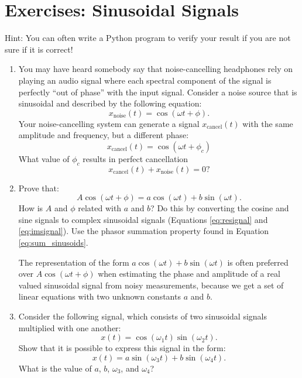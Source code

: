 \newpage
\section{Exercises: Sinusoidal Signals}

Hint: You can often write a Python program to verify your result if you are not sure if it is correct!

\begin{enumerate}

\item You may have heard somebody say that noise-cancelling headphones
  rely on playing an audio signal where each spectral component of the
  signal is perfectly ``out of phase'' with the input signal. Consider
  a noise source that is sinusoidal and described by the following
  equation:
\begin{equation}
x_{\mathrm{noise}}(t) = \cos(\omega t + \phi).
\end{equation}
Your noise-cancelling system can generate a signal
$x_{\mathrm{cancel}}(t)$ with the same amplitude and frequency, but a different phase:
\begin{equation}
x_{\mathrm{cancel}}(t) = \cos(\omega t + \phi_c)
\end{equation}
What value of $\phi_c$ results in perfect cancellation
\begin{equation}
  x_{\mathrm{cancel}}(t) + x_{\mathrm{noise}}(t) = 0?
\end{equation}

\item Prove that:
\begin{equation}
A\cos(\omega t + \phi) = a\cos(\omega t) + b\sin(\omega t). 
\end{equation}
How is $A$ and $\phi$ related with $a$ and $b$? Do this by converting the cosine and sine signals to complex sinusoidal signals (Equations \ref{eq:resignal} and \ref{eq:imsignal}). Use the phasor summation property found in Equation \ref{eq:sum_sinusoids}.

The representation of the form $a\cos(\omega t) + b\sin(\omega t)$ is often preferred over $A\cos(\omega t + \phi)$ when estimating the phase and amplitude of a real valued sinusoidal signal from noisy measurements, because we get a set of linear equations with two unknown constants $a$ and $b$.

\item Consider the following signal, which consists of two sinusoidal signals multiplied with one another:
\begin{equation}
x(t) = \cos(\omega_1 t)\sin(\omega_2 t).
\end{equation}
Show that it is possible to express this signal in the form:
\begin{equation}
x(t) = a \sin (\omega_3 t) + b \sin(\omega_4 t).
\end{equation}
What is the value of $a$, $b$, $\omega_3$, and $\omega_4$?



\end{enumerate}
